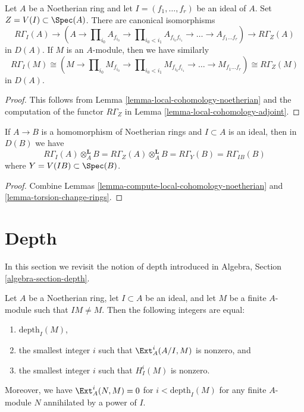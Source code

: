 \begin{lemma}
\label{lemma-compute-local-cohomology-noetherian}
Let $A$ be a Noetherian ring and let $I = (f_1, \ldots, f_r)$ be an ideal
of $A$. Set $Z = V(I) \subset \Spec(A)$. There are canonical isomorphisms
$$
R\Gamma_I(A) \to
(A \to \prod\nolimits_{i_0} A_{f_{i_0}} \to
\prod\nolimits_{i_0 < i_1} A_{f_{i_0}f_{i_1}} \to
\ldots \to A_{f_1\ldots f_r}) \to R\Gamma_Z(A)
$$
in $D(A)$. If $M$ is an $A$-module, then we have similarly
$$
R\Gamma_I(M) \cong
(M \to \prod\nolimits_{i_0} M_{f_{i_0}} \to
\prod\nolimits_{i_0 < i_1} M_{f_{i_0}f_{i_1}} \to
\ldots \to M_{f_1\ldots f_r}) \cong R\Gamma_Z(M)
$$
in $D(A)$.
\end{lemma}

\begin{proof}
This follows from Lemma \ref{lemma-local-cohomology-noetherian}
and the computation of the functor $R\Gamma_Z$ in
Lemma \ref{lemma-local-cohomology-adjoint}.
\end{proof}

\begin{lemma}
\label{lemma-local-cohomology-change-rings}
If $A \to B$ is a homomorphism of Noetherian rings and $I \subset A$
is an ideal, then in $D(B)$ we have
$$
R\Gamma_I(A) \otimes_A^\mathbf{L} B =
R\Gamma_Z(A) \otimes_A^\mathbf{L} B =
R\Gamma_Y(B) = R\Gamma_{IB}(B)
$$
where $Y = V(IB) \subset \Spec(B)$.
\end{lemma}

\begin{proof}
Combine Lemmas \ref{lemma-compute-local-cohomology-noetherian} and
\ref{lemma-torsion-change-rings}.
\end{proof}






\section{Depth}
\label{section-depth}

\noindent
In this section we revisit the notion of depth introduced in
Algebra, Section \ref{algebra-section-depth}.

\begin{lemma}
\label{lemma-depth}
Let $A$ be a Noetherian ring, let $I \subset A$ be an ideal, and
let $M$ be a finite $A$-module such that $IM \not = M$. Then
the following integers are equal:
\begin{enumerate}
\item $\text{depth}_I(M)$,
\item the smallest integer $i$ such that $\Ext_A^i(A/I, M)$
is nonzero, and
\item the smallest integer $i$ such that $H^i_I(M)$ is nonzero.
\end{enumerate}
Moreover, we have $\Ext^i_A(N, M) = 0$ for $i < \text{depth}_I(M)$
for any finite $A$-module $N$ annihilated by a power of $I$.
\end{lemma}

